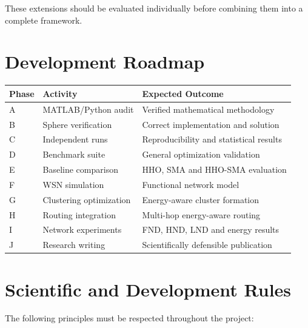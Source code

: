 \documentclass[12pt,a4paper]{report}
\begin{document}
These extensions should be evaluated individually
before combining them into a complete framework.

\chapter{Development Roadmap}

\begin{longtable}{p{}p{}p{}}
\toprule
\textbf{Phase} & \textbf{Activity} & \textbf{Expected Outcome}\\
\midrule
A & MATLAB/Python audit & Verified mathematical methodology\\
B & Sphere verification & Correct implementation and solution\\
C & Independent runs & Reproducibility and statistical results\\
D & Benchmark suite & General optimization validation\\
E & Baseline comparison & HHO, SMA and HHO-SMA evaluation\\
F & WSN simulation & Functional network model\\
G & Clustering optimization & Energy-aware cluster formation\\
H & Routing integration & Multi-hop energy-aware routing\\
I & Network experiments & FND, HND, LND and energy results\\
J & Research writing & Scientifically defensible publication\\
\bottomrule
\end{longtable}

\chapter{Scientific and Development Rules}

The following principles must be respected throughout
the project:
\end{document}
